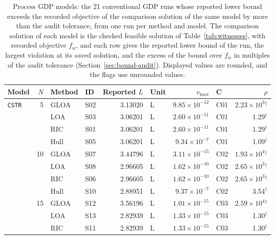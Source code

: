 \par\endgroup
\begin{table}[htbp]
\centering
\caption{Process GDP models: the 21 conventional GDP runs whose reported lower bound exceeds the recorded objective of the comparison solution of the same model by more than the audit tolerance, from one run per method and model.
The comparison solution of each model is the checked feasible solution of Table~\ref{tab:witnesses}, with recorded objective \(f_w\), and each row gives the reported lower bound of the run, the largest violation at its saved solution, and the excess of the bound over \(f_w\) in multiples of the audit tolerance (Section~\ref{sec:bound-audit}).
Displayed values are rounded, and the flags use unrounded values.}
\label{tab:bound-audit}
\footnotesize
\begin{threeparttable}
\begin{tabular}{@{}lrllrlrlr@{}}
\toprule
Model & \(N\) & Method & ID & Reported \(L\) & Unit & \(v_{\max}\) & C & \(\rho\)\\\midrule
\multirow{17}{*}{\texttt{CSTR}} & \multirow{4}{*}{5} & GLOA & S02 & 3.13020 & L & \(9.85\times10^{-12}\) & C01 & \(2.23\times10^{3}\)\(^{\dagger}\) \\
 & & LOA & S03 & 3.06201 & L & \(2.60\times10^{-11}\) & C01 & 1.29\(^{\dagger}\) \\
 & & RIC & S01 & 3.06201 & L & \(2.60\times10^{-11}\) & C01 & 1.29\(^{\dagger}\) \\
 & & Hull & S05 & 3.06201 & L & \(9.34\times10^{-7}\) & C01 & 1.09\(^{\dagger}\) \\
\addlinespace[2pt]
 & \multirow{4}{*}{10} & GLOA & S07 & 3.44796 & L & \(3.11\times10^{-15}\) & C02 & \(1.93\times10^{4}\)\(^{\dagger}\) \\
 & & LOA & S08 & 2.96605 & L & \(1.62\times10^{-10}\) & C02 & \(2.65\times10^{3}\)\(^{\dagger}\) \\
 & & RIC & S06 & 2.96605 & L & \(1.62\times10^{-10}\) & C02 & \(2.65\times10^{3}\)\(^{\dagger}\) \\
 & & Hull & S10 & 2.88951 & L & \(9.37\times10^{-7}\) & C02 & 3.54\(^{\dagger}\) \\
\addlinespace[2pt]
 & \multirow{3}{*}{15} & GLOA & S12 & 3.56196 & L & \(1.01\times10^{-15}\) & C03 & \(2.59\times10^{4}\)\(^{\dagger}\) \\
 & & LOA & S13 & 2.82939 & L & \(1.33\times10^{-15}\) & C03 & 1.30\(^{\dagger}\) \\
 & & RIC & S11 & 2.82939 & L & \(1.33\times10^{-15}\) & C03 & 1.30\(^{\dagger}\) \\

\end{tabular}
\end{threeparttable}
\end{table}

